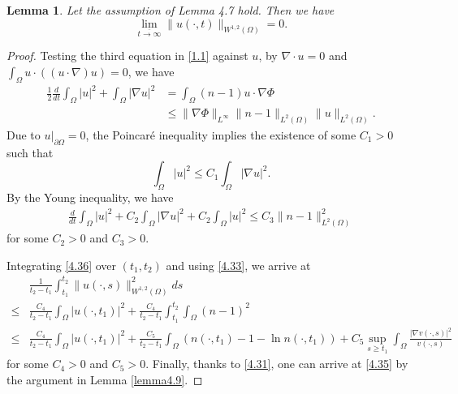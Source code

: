 \documentclass[12pt]{article}
\theoremstyle{plain}
\newtheorem{lemma}{Lemma}[section]
\theoremstyle{definition}
\numberwithin{equation}{section}
\begin{document}
\begin{lemma}\label{lemma4.10}
Let the assumption of Lemma 4.7 hold. Then  we have
 \begin{equation}\label{4.35}
\displaystyle\lim_{ \overline{t\rightarrow \infty}} \|u(\cdot,t)\|_{W^{1,2}(\Omega)}= 0.
\end{equation}
\end{lemma}
\begin{proof}[Proof]
Testing the third equation in \eqref{1.1} against $u$, by $\nabla\cdot u=0$ and
$\int_\Omega u\cdot((u\cdot\nabla)u)=0$, we have
\begin{equation*}
\begin{split}
\frac1 2\frac d{dt}\int_\Omega|u|^2+\int_\Omega|\nabla u|^2&=
\int_\Omega (n-1)u\cdot\nabla\Phi\\
&\leq
\|\nabla\Phi\|_{L^\infty}
\|n-1\|_{L^2(\Omega)} \|u\|_{L^2(\Omega)}.
\end{split}
\end{equation*}
Due to $u|_{\partial\Omega}=0$,  the Poincar\'{e} inequality implies the existence of some $C_1>0$ such that
\begin{equation*}
\int_\Omega|u|^2\leq C_1\int_\Omega|\nabla u|^2.
\end{equation*}
By the Young inequality, we have
\begin{equation}\label{4.36}
\begin{split}
\frac d{dt}\int_\Omega|u|^2+C_2\int_\Omega|\nabla u|^2+ C_2\int_\Omega| u|^2 \leq
C_3\|n-1\|^2_{L^2(\Omega)}
\end{split}
\end{equation}
for some $C_2>0$ and $C_3>0$.

Integrating  \eqref{4.36} over $(t_1,t_2)$ and using \eqref{4.33}, we arrive at
\begin{equation}\label{4.37}
\begin{split}
&\frac{1}{t_2-t_1}\int^{t_2}_{t_1}\|u(\cdot,s)\|^2_{W^{1,2}(\Omega)}ds\\
\leq & \frac{C_4}{t_2-t_1} \int_\Omega |u(\cdot,t_1)|^2
+
\frac{C_4}{t_2-t_1} \int^{t_2}_{t_1} \int_\Omega (n-1)^2
\\
\leq &
\frac{C_4}{t_2-t_1} \int_\Omega |u(\cdot,t_1)|^2
+
\frac{C_5}{t_2-t_1} \int_\Omega(n(\cdot,t_1)-1-\ln n(\cdot,t_1))
+
C_5 \sup_{s\geq t_1} \int_\Omega \frac {|\nabla v(\cdot,s)|^2}{v(\cdot,s)}
\end{split}
\end{equation}
for some $C_4>0$ and $C_5>0$.
Finally, thanks to \eqref{4.31}, one can arrive at \eqref{4.35} by the argument in Lemma \ref{lemma4.9}.
\end{proof}
\end{document}
